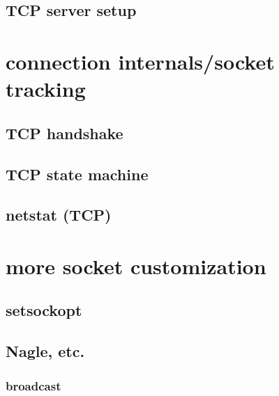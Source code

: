 \subsection{TCP server setup}


\section{connection internals/socket tracking}
\subsection{TCP handshake}


\subsection{TCP state machine}


\subsection{netstat (TCP)}


\section{more socket customization}
\subsection{setsockopt}


\subsection{Nagle, etc.}


\subsubsection{broadcast}


